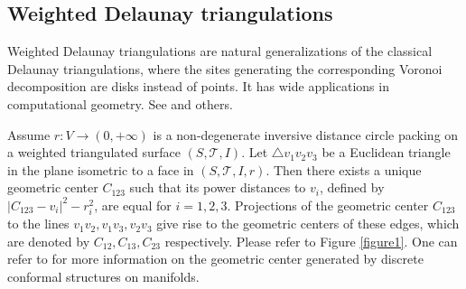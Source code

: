 \documentclass[12pt]{amsart}
\newtheorem{corollary}[theorem]{Corollary}
\def\qed{\hfill{Q.E.D.}\smallskip}
\begin{document}
	


	\subsection{Weighted Delaunay triangulations}\label{subsection weight Delaunay}
	Weighted Delaunay triangulations are natural generalizations of the classical Delaunay triangulations, where the sites generating the corresponding Voronoi decomposition are disks instead of points. It has wide applications in computational geometry.
See \cite{AK, Ed} and others.

	Assume $r: V\rightarrow (0, +\infty)$ is a non-degenerate inversive distance circle packing on
a weighted triangulated surface $(S, \mathcal{T}, I)$.
Let $\triangle v_1v_2v_3$ be a Euclidean triangle in the plane isometric to a face in $(S, \mathcal{T}, I, r)$.
Then there exists a unique geometric center $C_{123}$ such that its power distances to $v_i$, defined by $|C_{123}-v_i|^2 - r_i^2$, are equal for $i = 1,2,3.$
Projections of the geometric center $C_{123}$ to the lines $v_1v_2, v_1v_3, v_2v_3$ give rise to the geometric centers of these edges, which are denoted by $C_{12}, C_{13}, C_{23}$ respectively.
Please refer to Figure \ref{figure1}.
One can refer to \cite{Glickenstein DCG, Glickenstein JDG, Glickenstein preprint, GT} for more information on the geometric center generated
by discrete conformal structures on manifolds.
\end{document}
